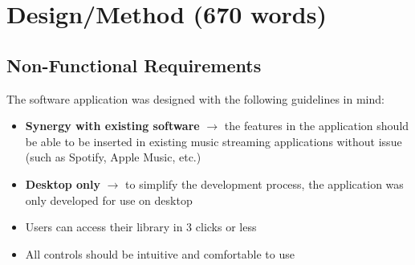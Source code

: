 \chapter{Design/Method (670 words)}

\section{Non-Functional Requirements}
The software application was designed with the following guidelines in mind:\begin{itemize}
    \item \textbf{
        Synergy with existing software
    } \(\to\) the features in the application should be able to be inserted in existing music streaming applications without issue (such as Spotify, Apple Music, etc.) %
    \item \textbf{
        Desktop only
    } \(\to\) to simplify the development process, the application was only developed for use on desktop
    \item Users can access their library in 3 clicks or less %
    \item All controls should be intuitive and comfortable to use
\end{itemize} %

